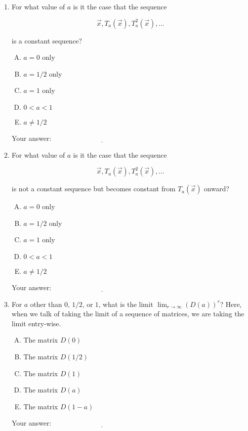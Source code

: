 \documentclass[10pt]{amsart}
\begin{document}
\begin{enumerate}
\item For what value of $a$ is it the case that the sequence

  $$\vec{x}, T_a(\vec{x}), T_a^2(\vec{x}), \dots$$

  is a constant sequence?

  \begin{enumerate}[(A)]
  \item $a = 0$ only
  \item $a = 1/2$ only
  \item $a = 1$ only
  \item $0 < a < 1$
  \item $a \ne 1/2$
  \end{enumerate}

  \vspace{0.1in}
  Your answer: $\underline{\qquad\qquad\qquad\qquad\qquad\qquad\qquad}$
  \vspace{0.1in}

\item For what value of $a$ is it the case that the sequence

  $$\vec{x}, T_a(\vec{x}), T_a^2(\vec{x}), \dots$$

  is not a constant sequence but becomes constant from $T_a(\vec{x})$
  onward?

  \begin{enumerate}[(A)]
  \item $a = 0$ only
  \item $a = 1/2$ only
  \item $a = 1$ only
  \item $0 < a < 1$ 
  \item $a \ne 1/2$
  \end{enumerate}

  \vspace{0.1in}
  Your answer: $\underline{\qquad\qquad\qquad\qquad\qquad\qquad\qquad}$
  \vspace{0.1in}

\item For $a$ other than $0$, $1/2$, or $1$, what is the limit
  $\lim_{r \to \infty} (D(a))^r$? Here, when we talk of taking the
  limit of a sequence of matrices, we are taking the limit entry-wise.

  \begin{enumerate}[(A)]
  \item The matrix $D(0)$
  \item The matrix $D(1/2)$
  \item The matrix $D(1)$
  \item The matrix $D(a)$
  \item The matrix $D(1 - a)$
  \end{enumerate}

  \vspace{0.1in}
  Your answer: $\underline{\qquad\qquad\qquad\qquad\qquad\qquad\qquad}$
  \vspace{0.1in}
\end{enumerate}
\end{document}

